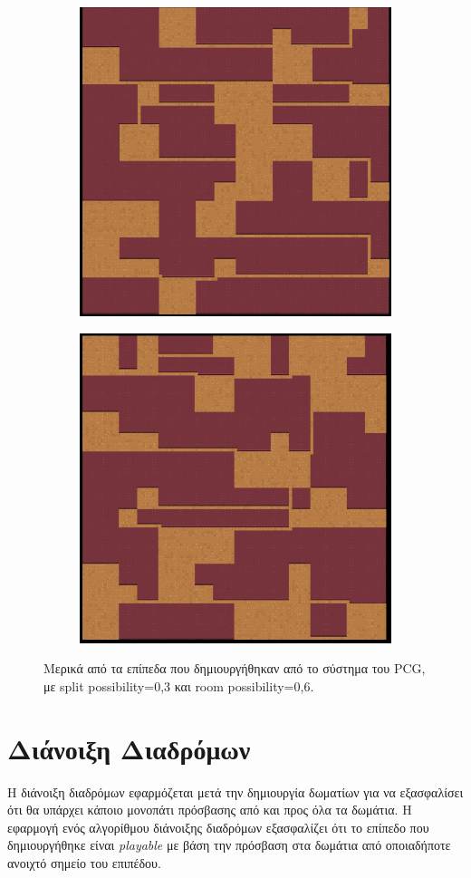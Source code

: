 \begin{figure}[H]
\begin{subfigure}{.5\textwidth}
  \includegraphics[width=.8\linewidth]{../images/pcg_quadtree/pcg5.png}
  \label{fig:sfig1}
\end{subfigure}%
\begin{subfigure}{.5\textwidth}
  \centering
  \includegraphics[width=.8\linewidth]{../images/pcg_quadtree/pcg6.png}
  \label{fig:sfig2}
\end{subfigure}
\caption{Μερικά από τα επίπεδα που δημιουργήθηκαν από το σύστημα του PCG, με split possibility=0,3 και room possibility=0,6.}
\label{fig:fig}
\end{figure}


\section{Διάνοιξη Διαδρόμων}
Η διάνοιξη διαδρόμων εφαρμόζεται μετά την δημιουργία δωματίων για να εξασφαλίσει ότι θα υπάρχει κάποιο μονοπάτι πρόσβασης από και προς όλα τα δωμάτια. Η εφαρμογή ενός αλγορίθμου διάνοιξης διαδρόμων εξασφαλίζει ότι το επίπεδο που δημιουργήθηκε είναι \textit{playable} με βάση την πρόσβαση στα δωμάτια από οποιαδήποτε ανοιχτό σημείο του επιπέδου.


